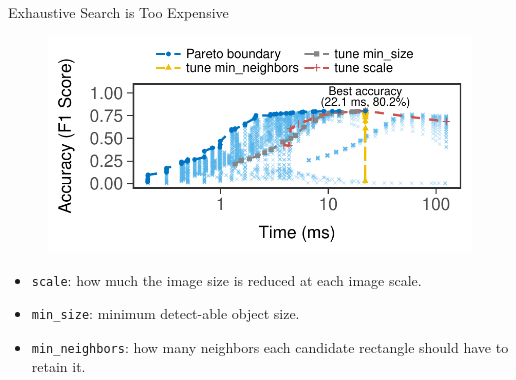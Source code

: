 \begin{frame}{Exhaustive Search is Too Expensive}
  \vspace{1em}
  \begin{figure}
    \centering
    \includegraphics[width=0.8\linewidth]{figures/serving-eval-exhaustive.pdf}
  \end{figure}

  \begin{itemize}
    \item \texttt{scale}: how much the image size is reduced at each image
      scale.
    \item \texttt{min\_size}: minimum detect-able object size.
    \item \texttt{min\_neighbors}: how many neighbors each candidate rectangle
      should have to retain it.
  \end{itemize}
\end{frame}

